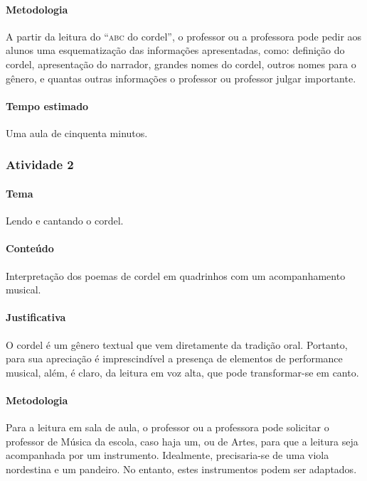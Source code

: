 \documentclass[11pt]{extarticle}
\begin{document}
\paragraph{Metodologia} A partir da leitura do ``\textsc{abc} do cordel'', o professor ou a professora pode pedir
aos alunos uma esquematização das informações apresentadas, como:
definição do cordel, apresentação do narrador, grandes nomes do cordel,
outros nomes para o gênero, e quantas outras informações o professor ou professor
julgar importante. 

\paragraph{Tempo estimado} Uma aula de cinquenta minutos.



\pagebreak

\subsubsection{Atividade 2}


\paragraph{Tema} Lendo e cantando o cordel. 


\paragraph{Conteúdo} Interpretação dos poemas de cordel em quadrinhos com um
acompanhamento musical.

\paragraph{Justificativa} O cordel é um gênero textual que vem diretamente da
tradição oral. Portanto, para sua apreciação é imprescindível 
a presença de elementos de performance musical, além, é claro, da leitura
em voz alta, que pode transformar-se em canto.

\paragraph{Metodologia} Para a leitura em sala de aula, o professor ou a professora pode solicitar o
professor de Música da escola, caso haja um, ou de Artes, para que a leitura
seja acompanhada por um instrumento. Idealmente, precisaria-se de uma viola nordestina 
e um pandeiro. No entanto, estes instrumentos podem ser adaptados. 
\end{document}
